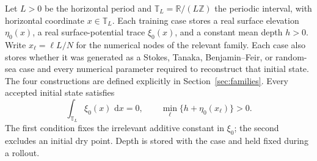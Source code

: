 \documentclass[11pt]{article}
\newcommand{\T}{\mathbb T}
\newcommand{\R}{\mathbb R}
\newcommand{\dd}{\,\mathrm d}
\begin{document}
Let $L>0$ be the horizontal period and
$\T_L=\R/(L\mathbb Z)$ the periodic interval, with horizontal coordinate
$x\in\T_L$.  Each training case stores a real surface elevation
$\eta_0(x)$, a real surface-potential trace $\xi_0(x)$, and a constant mean
depth $h>0$.  Write $x_\ell=\ell L/N$ for the numerical nodes of the relevant
family.  Each case also stores whether it was generated as a Stokes, Tanaka,
Benjamin--Feir, or random-sea case and every numerical parameter required to
reconstruct that initial state.  The four constructions are defined
explicitly in Section~\ref{sec:families}.
Every accepted initial state satisfies
\begin{equation}
  \int_{\T_L}\xi_0(x)\,\dd x=0,
  \qquad
  \min_\ell\{h+\eta_0(x_\ell)\}>0.
  \label{eq:case-gauge-and-depth}
\end{equation}
The first condition fixes the irrelevant additive constant in $\xi_0$; the
second excludes an initial dry point.  Depth is stored with the case and held
fixed during a rollout.
\end{document}
